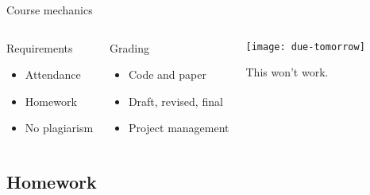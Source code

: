 \documentclass[t]{beamer}
\begin{document}
  \begin{frame}[t]{Course mechanics}

  \begin{columns}[T]


    \begin{block}{Requirements}
      \begin{itemize}
        \item Attendance
        \item Homework
        \item No plagiarism
      \end{itemize}
    \end{block}
  
    \begin{alertblock}{Grading}
      \begin{itemize}
        \item Code and paper
        \item Draft, revised, final
        \item Project management
      \end{itemize}
    \end{alertblock}


    \begin{center}
      \texttt{[image: due-tomorrow]}\vspace{1em}
      
      This won't work.
    \end{center}

  \end{columns} 
    
  \end{frame}

  \subsection{Homework}
  
\end{document}
